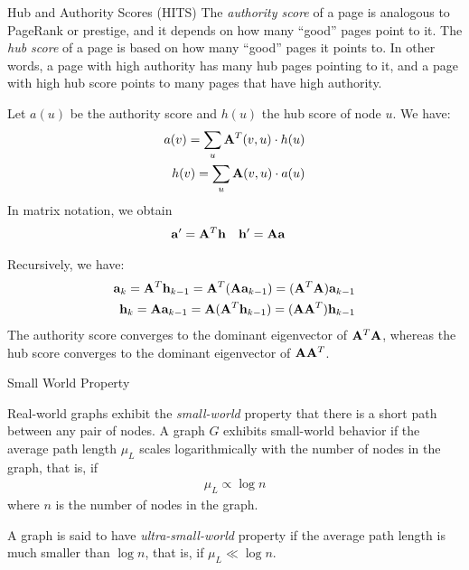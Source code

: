 \begin{frame}{Hub and Authority Scores (HITS)}
  \small
The
{\em authority score} of a page is analogous to PageRank or prestige,
and it depends on how many ``good'' pages point to it. 
The {\em hub score} of a page is based on how many ``good'' pages
it points to. 
In other words, a page with high authority has many hub
pages pointing to it, and a page with high hub score points to many
pages that have high authority.

\medskip
Let $a(u)$ be the authority score and $h(u)$ the hub score of
node $u$. We have:
\begin{align*}
  a(v) = \sum_u \mathbf{A}^T(v,u)\cdot h(u)\\
  h(v) = \sum_u \mathbf{A}(v,u)\cdot a(u)
\end{align*}
In matrix notation, we obtain
\begin{align*}
  \mathbf{a}' & = \mathbf{A}^T \mathbf{h} & 
  \mathbf{h}' & = \mathbf{A} \mathbf{a}
\end{align*}

\medskip
Recursively, we have:
\begin{align*}
  \mathbf{a}_k = \mathbf{A}^T \mathbf{h}_{k-1} = \mathbf{A}^T (\mathbf{A} \mathbf{a}_{k-1}) = (\mathbf{A}^T\mathbf{A}) \mathbf{a}_{k-1} \\
  \mathbf{h}_k = \mathbf{A} \mathbf{a}_{k-1} = \mathbf{A} (\mathbf{A}^T \mathbf{h}_{k-1}) = (\mathbf{A}\mathbf{A}^T) \mathbf{h}_{k-1}
\end{align*}
The authority score converges to the
dominant eigenvector of $\mathbf{A}^T\mathbf{A}$, whereas the hub score converges to
the dominant eigenvector of $\mathbf{A}\mathbf{A}^T$. 
\end{frame}


\begin{frame}{Small World Property}

Real-world graphs exhibit the
 {\em small-world} property that there is a short path
between any pair of nodes.
A
graph $G$ exhibits small-world behavior if the average path
length $\mu_L$ scales logarithmically with the number of nodes in the
graph, that is, if
\begin{align*}
    \mu_L \propto \log n
\end{align*}
where $n$ is the number of nodes in the graph.

\medskip
A graph is said to have {\em ultra-small-world} property if the
average path length is much smaller than $\log n$, that is, if
$\mu_L \ll \log n$.
\end{frame}




